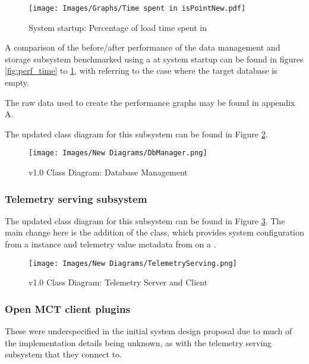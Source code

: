 \begin{figure}[ht]
  \centering
  \texttt{[image: Images/Graphs/Time spent in isPointNew.pdf]}
  \caption{System startup: Percentage of load time spent in }
  \label{fig:perf_percentage}
\end{figure}

A comparison of the before/after performance of the data management and storage subsystem benchmarked using a  at system startup can be found in figures \ref{fig:perf_time} to \ref{fig:perf_percentage}, with  referring to the case where the target database is empty.

The raw data used to create the performance graphs may be found in appendix A.

The updated class diagram for this subsystem can be found in Figure \ref{fig:new_cddb}.

\begin{figure}[H]
  \centering
  \texttt{[image: Images/New Diagrams/DbManager.png]}
  \caption{v1.0 Class Diagram: Database Management}
  \label{fig:new_cddb}
\end{figure}

\subsubsection{Telemetry serving subsystem}
The updated class diagram for this subsystem can be found in Figure \ref{fig:new_cdserving}. The main change here is the addition of the  class, which provides system configuration from a  instance and telemetry value metadata from  on a .

\begin{figure}[H]
  \centering
  \texttt{[image: Images/New Diagrams/TelemetryServing.png]}
  \caption{v1.0 Class Diagram: Telemetry Server and Client}
  \label{fig:new_cdserving}
\end{figure}

\subsubsection{Open MCT client plugins}
These were underspecified in the initial system design proposal due to much of the implementation details being unknown, as with the telemetry serving subsystem that they connect to.

